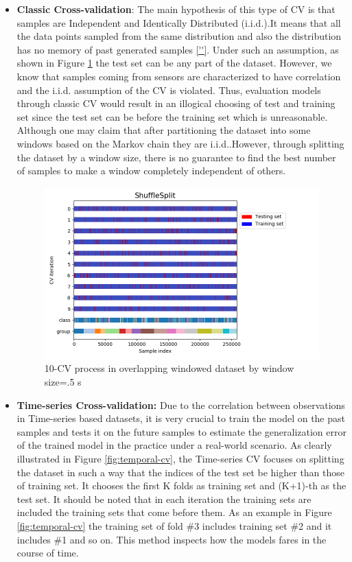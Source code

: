\begin{itemize}
\item \textbf{Classic Cross-validation}: The main hypothesis of this type of CV is that samples are Independent and Identically Distributed (i.i.d.).It means that all the data points sampled from the same distribution and also the distribution has no memory of past generated samples \ref{''}. Under such an assumption, as shown in Figure \ref{fig:iid-cv} the test set can be any part of the dataset. However, we know that samples coming from sensors are characterized to have correlation and the i.i.d. assumption of the CV is violated. Thus, evaluation models through classic CV would result in an illogical choosing of test and training set since the test set can be before the training set which is unreasonable. Although one may claim that after partitioning the dataset into some windows based on the Markov chain \cite{gilks1995markov} they are i.i.d..However, through splitting the dataset by a window size, there is no guarantee to find the best number of samples to make a window completely independent of others. 

\begin{figure}[h]
    \centering
    \includegraphics[width=.5\textwidth]{Figures/ShuffleSplit.png}
    \caption{10-CV process in overlapping windowed dataset by window size=.5 s }
    \label{fig:iid-cv}
\end{figure}


\item \textbf{Time-series Cross-validation:}
Due to the correlation between observations in Time-series based datasets, it is very crucial to train the model on the past samples and tests it on the future samples to estimate the generalization error of the trained model in the practice under a real-world scenario. As clearly illustrated in Figure \ref{fig:temporal-cv}, the Time-series CV focuses on splitting the dataset in such a way that the indices of the test set be higher than those of training set. It chooses the first K folds as training set and (K+1)-th as the test set. It should be noted that in each iteration the training sets are included the training sets that come before them. As an example in Figure \ref{fig:temporal-cv} the training set of fold \#3 includes training set \#2 and it includes \#1 and so on.
This method inspects how the models fares in the course of time.



\end{itemize}
